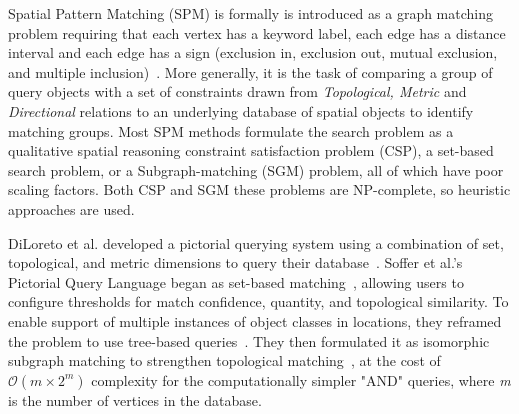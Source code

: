\par{
    Spatial Pattern Matching (SPM) is formally is introduced as a graph matching problem requiring that each vertex has a keyword label, each edge has a distance interval and each edge has a sign (exclusion in, exclusion out, mutual exclusion, and multiple inclusion)~\cite{Fang2019}.
    More generally, it is the task of comparing a group of query objects with a set of constraints drawn from \textit{Topological, Metric} and \textit{Directional} relations to an underlying database of spatial objects to identify matching groups.
    Most SPM methods formulate the search problem as a qualitative spatial reasoning constraint satisfaction problem (CSP), a set-based search problem, or a Subgraph-matching (SGM) problem, all of which have poor scaling factors. Both CSP and SGM these problems are NP-complete, so heuristic approaches are used. 
    }
\par{  
    DiLoreto et al. developed a pictorial querying system using a combination of set, topological, and metric dimensions to query their database~\cite{DiLoreto1996}.
    Soffer et al.'s Pictorial Query Language began as set-based matching~\cite{Soffer1997, Soffer1998a}, allowing users to configure thresholds for match confidence, quantity, and topological similarity.
    To enable support of multiple instances of object classes in locations, they reframed the problem to use tree-based queries~\cite{Soffer1999}.
    They then formulated it as isomorphic subgraph matching to strengthen topological matching~\cite{Folkers2000}, at the cost of $\mathcal{O}(m\times 2^m)$ complexity for the computationally simpler "AND" queries, where \textit{m} is the number of vertices in the database. 
}

